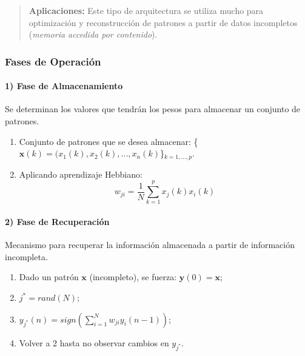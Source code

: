 \documentclass[10pt,a4paper]{article}
\begin{document}
\begin{quote}
\textbf{Aplicaciones:} Este tipo de arquitectura se utiliza mucho para optimización y reconstrucción de patrones a partir de datos incompletos (\textit{memoria accedida por contenido}).
\end{quote}

\subsubsection{Fases de Operación}

\begin{multicols}{2}

\paragraph{1) Fase de Almacenamiento}
Se determinan los valores que tendrán los pesos para almacenar un conjunto de patrones.
\begin{enumerate}
\item Conjunto de patrones que se desea almacenar: \{$\mathbf{x}(k)=(x_1(k), x_2(k), ..., x_n(k)$\}$_{k=1,...,p}$.
\item Aplicando aprendizaje Hebbiano:
\[w_{ji}=\frac{1}{N}\sum_{k=1}^p x_{j}(k) x_{i}(k)\]
\end{enumerate}

\paragraph{2) Fase de Recuperación}
Mecanismo para recuperar la información almacenada a partir de
información incompleta.
\begin{enumerate}
\item Dado un patrón $\mathbf{x}$ (incompleto), se fuerza: $\mathbf{y}(0)=\mathbf{x}$;
\item $j^* = rand(N)$;
\item $y_{j^*}(n) = sign\left(\sum_{i=1}^N w_{ji} y_i (n-1)\right)$;
\item Volver a 2 hasta no observar cambios en $y_{j^*}$.
\end{enumerate}

\end{multicols}
\end{document}
